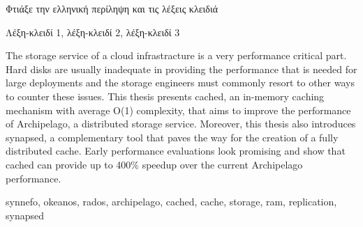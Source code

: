 \begin{abstractgr}
	\todo Φτιάξε την ελληνική περίληψη και τις λέξεις κλειδιά
\begin{keywordsgr}
  	Λέξη-κλειδί 1, λέξη-κλειδί 2, λέξη-κλειδί 3
\end{keywordsgr}
\end{abstractgr}

\begin{abstracten}
	The storage service of a cloud infrastracture is a very performance 
	critical part. Hard disks are usually inadequate in providing the 
	performance that is needed for large deployments and the storage 
	engineers must commonly resort to other ways to counter these issues.  
	This thesis presents cached, an in-memory caching mechanism with 
	average O(1) complexity, that aims to improve the performance of 
	Archipelago, a distributed storage service.  Moreover, this thesis also 
	introduces synapsed, a complementary tool that paves the way for the 
	creation of a fully distributed cache. Early performance evaluations 
	look promising and show that cached can provide up to 400\% speedup 
	over the current Archipelago performance.
	\begin{keywordsen}
		synnefo, okeanos, rados, archipelago, cached, cache, storage, 
		ram, replication, synapsed
	\end{keywordsen}
\end{abstracten}

\begin{acknowledgementsgr}
	\todo
\end{acknowledgementsgr}



